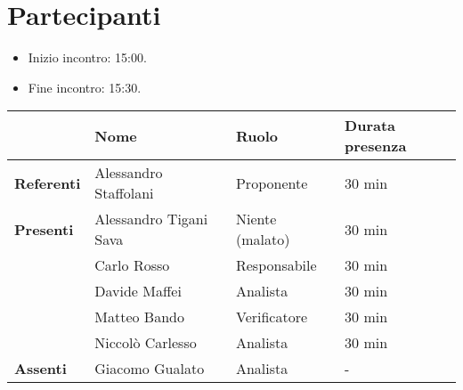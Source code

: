 \section*{Partecipanti}

\begin{itemize}
	\item Inizio incontro: 15:00.
	\item Fine incontro: 15:30.
\end{itemize}


\begin{center}
	{\renewcommand{\arraystretch}{1.5}
		\begin{tabular}{l|lll}
			                   & \textbf{Nome}          & \textbf{Ruolo}  & \textbf{Durata presenza} \\
			\hline
			\textbf{Referenti} & Alessandro Staffolani  & Proponente      & 30 min                   \\
			\hline
			\textbf{Presenti}  & Alessandro Tigani Sava & Niente (malato) & 30 min                   \\
			                   & Carlo Rosso            & Responsabile    & 30 min                   \\
			                   & Davide Maffei          & Analista        & 30 min                   \\
			                   & Matteo Bando           & Verificatore    & 30 min                   \\
			                   & Niccolò Carlesso       & Analista        & 30 min                   \\
			\hline
			\textbf{Assenti}   & Giacomo Gualato        & Analista        & -                        \\
		\end{tabular}
	}
\end{center}
